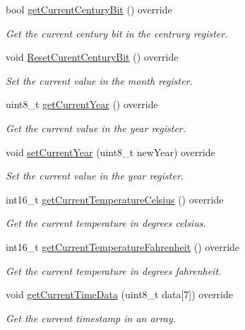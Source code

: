 \begin{DoxyCompactItemize}
bool \mbox{\hyperlink{class_d_s3231_a38dfc1567d3419d5aeecd2062d4121c7}{get\+Current\+Century\+Bit}} () override
\begin{DoxyCompactList}\small\item\em Get the current century bit in the centrury register. \end{DoxyCompactList}\item 
void \mbox{\hyperlink{class_d_s3231_a6477bd1bb91d3df6a088c369692f46a3}{Reset\+Curent\+Century\+Bit}} () override
\begin{DoxyCompactList}\small\item\em Set the current value in the month register. \end{DoxyCompactList}\item 
uint8\+\_\+t \mbox{\hyperlink{class_d_s3231_a28a340b10b045ad1e8b94532a57c3759}{get\+Current\+Year}} () override
\begin{DoxyCompactList}\small\item\em Get the current value in the year register. \end{DoxyCompactList}\item 
void \mbox{\hyperlink{class_d_s3231_a59a60a725581bc8e5dcf857ea52c6281}{set\+Current\+Year}} (uint8\+\_\+t new\+Year) override
\begin{DoxyCompactList}\small\item\em Set the current value in the year register. \end{DoxyCompactList}\item 
int16\+\_\+t \mbox{\hyperlink{class_d_s3231_abd46c1cf5f5c78e3222c3677e70a1272}{get\+Current\+Temperature\+Celsius}} () override
\begin{DoxyCompactList}\small\item\em Get the current temperature in degrees celsius. \end{DoxyCompactList}\item 
int16\+\_\+t \mbox{\hyperlink{class_d_s3231_aa31acb133cc63aa7a2a25eda6244c9df}{get\+Current\+Temperature\+Fahrenheit}} () override
\begin{DoxyCompactList}\small\item\em Get the current temperature in degrees fahrenheit. \end{DoxyCompactList}\item 
void \mbox{\hyperlink{class_d_s3231_a0ca41c2242367c5ff1424d1b12f909c5}{get\+Current\+Time\+Data}} (uint8\+\_\+t data\mbox{[}7\mbox{]}) override
\begin{DoxyCompactList}\small\item\em Get the current timestamp in an array. \end{DoxyCompactList}\item 

\end{DoxyCompactItemize}
